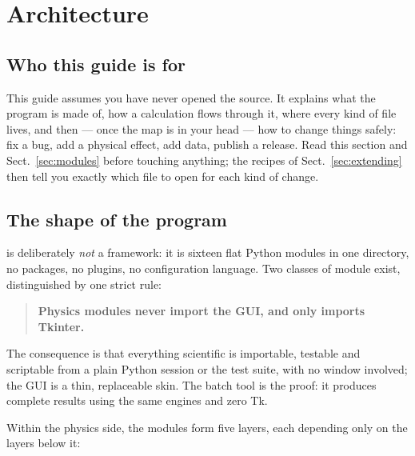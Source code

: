 \section{Architecture}

\subsection{Who this guide is for}

This guide assumes you have never opened the \spetc{} source. It explains
what the program is made of, how a calculation flows through it, where
every kind of file lives, and then --- once the map is in your head ---
how to change things safely: fix a bug, add a physical effect, add data,
publish a release. Read this section and Sect.~\ref{sec:modules} before
touching anything; the recipes of Sect.~\ref{sec:extending} then tell you
exactly which file to open for each kind of change.

\subsection{The shape of the program}

\spetc{} is deliberately \emph{not} a framework: it is sixteen flat Python
modules in one directory, no packages, no plugins, no configuration
language. Two classes of module exist, distinguished by one strict rule:

\begin{quote}
\textbf{Physics modules never import the GUI, and only 
imports Tkinter.}
\end{quote}

The consequence is that everything scientific is importable, testable and
scriptable from a plain Python session or the test suite, with no window
involved; the GUI is a thin, replaceable skin. The batch tool
 is the proof: it produces complete results using
the same engines and zero Tk.

Within the physics side, the modules form five layers, each depending
only on the layers below it:

